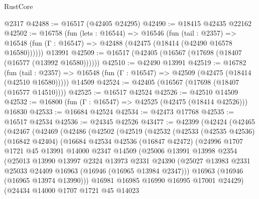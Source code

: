 \begin{lexlean}{RustCore}
\begin{coremodule}
    @2317
@42488 := @16517 (@42405 @24295)
@42490 := @18415 @42435 @22162
@42502 := @16758
    (fun (lets : @16544) =>
    @16546
      (fun (tail : @2357) =>
      @16548 (fun (Γ : @16547) => @42488 (@42475 (@18414 (@42490 @16578 @16580))))))
    @13991
@42509 := @16517 (@42405 (@16567 (@17698 (@18407 (@16577 (@13992 @16580))))))
@42510 := @42490 @13991
@42519 := @16782
    (fun (tail : @2357) => @16548 (fun (Γ : @16547) => @42509 (@42475 (@18414 (@42510 @16580)))))
    @14509
@42524 := @42405 (@16567 (@17698 (@18407 (@16577 @14510))))
@42525 := @16517 @42524
@42526 := @42510 @14509
@42532 := @16800 (fun (Γ : @16547) => @42525 (@42475 (@18414 @42526))) @16830
@42533 := @16684 @42524
@42534 := @42473 @17768
@42535 := @16517 @42534
@42536 := @24345 @42526
@43477 := @42399
    (@42424
      (@42465
        (@42467
          (@42469
            (@42486
              (@42502
                (@42519
                  (@42532
                    (@42533
                      (@42535 @42536)
                      (@16842 @42404)
                      (@16684
                        @42534
                        @42536
                        (@16847 @42472)
                        (@24996
                          @1707
                          @1721
                          @45
                          @13991
                          @14000
                          @2347
                          @14509
                          (@25006
                            @13991
                            @13998
                            @2354
                            (@25013
                              @13990
                              @13997
                              @2324
                              @13973
                              @2331
                              @24390
                              (@25027
                                @13983
                                @2331
                                @25033
                                @24409
                                @16963
                                (@16946 (@16965 @13984 @2347)))
                              @16963
                              (@16946 (@16965 @13974 @13990)))
                            @16981
                            @16985
                            @16990
                            @16995
                            @17001
                            @24429)
                          (@24434
                            @14000
                            @1707
                            @1721
                            @45
                            @14023

\end{coremodule}
\end{lexlean}
